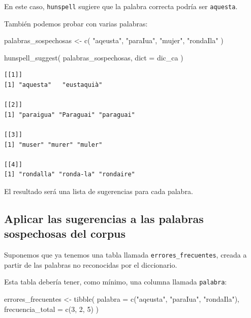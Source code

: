 \documentclass[
  letterpaper,
  DIV=11,
  numbers=noendperiod]{scrreprt}
\newenvironment{Shaded}{\begin{snugshade}}{\end{snugshade}}
\newcommand{\AttributeTok}[1]{\textcolor[rgb]{0.40,0.45,0.13}{#1}}
\newcommand{\DecValTok}[1]{\textcolor[rgb]{0.68,0.00,0.00}{#1}}
\newcommand{\FunctionTok}[1]{\textcolor[rgb]{0.28,0.35,0.67}{#1}}
\newcommand{\NormalTok}[1]{\textcolor[rgb]{0.00,0.23,0.31}{#1}}
\newcommand{\OtherTok}[1]{\textcolor[rgb]{0.00,0.23,0.31}{#1}}
\newcommand{\StringTok}[1]{\textcolor[rgb]{0.13,0.47,0.30}{#1}}
\begin{document}
En este caso, \texttt{hunspell} sugiere que la palabra correcta podría
ser \texttt{aquesta}.

También podemos probar con varias palabras:

\begin{Shaded}
\begin{Highlighting}[]
\NormalTok{palabras\_sospechosas }\OtherTok{\textless{}{-}} \FunctionTok{c}\NormalTok{(}
  \StringTok{"aqeusta"}\NormalTok{,}
  \StringTok{"paraIua"}\NormalTok{,}
  \StringTok{"mujer"}\NormalTok{,}
  \StringTok{"rondaIla"}
\NormalTok{)}

\FunctionTok{hunspell\_suggest}\NormalTok{(}
\NormalTok{  palabras\_sospechosas,}
  \AttributeTok{dict =}\NormalTok{ dic\_ca}
\NormalTok{)}
\end{Highlighting}
\end{Shaded}

\begin{verbatim}
[[1]]
[1] "aquesta"   "eustaquià"

[[2]]
[1] "paraigua" "Paraguai" "paraguai"

[[3]]
[1] "muser" "murer" "muler"

[[4]]
[1] "rondalla" "ronda-la" "rondaire"
\end{verbatim}

El resultado será una lista de sugerencias para cada palabra.

\subsection{Aplicar las sugerencias a las palabras sospechosas del
corpus}\label{aplicar-las-sugerencias-a-las-palabras-sospechosas-del-corpus}

Suponemos que ya tenemos una tabla llamada \texttt{errores\_frecuentes},
creada a partir de las palabras no reconocidas por el diccionario.

Esta tabla debería tener, como mínimo, una columna llamada
\texttt{palabra}:

\begin{Shaded}
\begin{Highlighting}[]
\NormalTok{errores\_frecuentes }\OtherTok{\textless{}{-}} \FunctionTok{tibble}\NormalTok{(}
  \AttributeTok{palabra =} \FunctionTok{c}\NormalTok{(}\StringTok{"aqeusta"}\NormalTok{, }\StringTok{"paraIua"}\NormalTok{, }\StringTok{"rondaIla"}\NormalTok{),}
  \AttributeTok{frecuencia\_total =} \FunctionTok{c}\NormalTok{(}\DecValTok{3}\NormalTok{, }\DecValTok{2}\NormalTok{, }\DecValTok{5}\NormalTok{)}
\NormalTok{)}
\end{Highlighting}
\end{Shaded}
\end{document}
